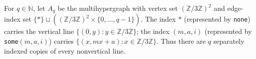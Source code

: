 \begin{definition}
For $q\in\mathbb N$, let $A_q$ be the multihypergraph with vertex set
$(\mathbb Z/3\mathbb Z)^2$ and edge-index set
$\{\ast\}\sqcup((\mathbb Z/3\mathbb Z)^2\times\{0,\ldots,q-1\})$.
The index $\ast$ (represented by \texttt{none}) carries the vertical line
$\{(0,y):y\in\mathbb Z/3\mathbb Z\}$; the index $(m,a,i)$
(represented by \texttt{some}$(m,a,i)$) carries
$\{(x,mx+a):x\in\mathbb Z/3\mathbb Z\}$.
Thus there are $q$ separately indexed copies of every nonvertical line.
\end{definition}
